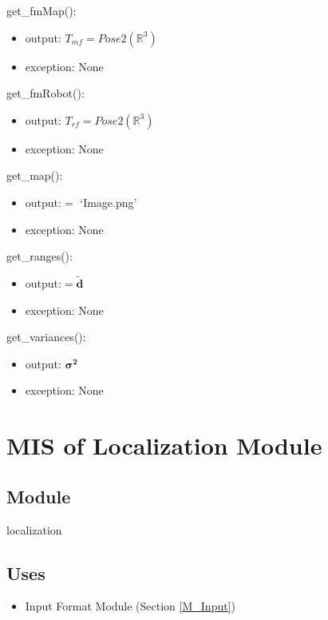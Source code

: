 \documentclass[12pt, titlepage]{article}
\begin{document}
\noindent get\_fmMap():
\begin{itemize}
    \item output: $T_{mf}=Pose2(\mathbb{R}^{3})$
    \item exception: None
\end{itemize}

\noindent get\_fmRobot():
\begin{itemize}
    \item output: $T_{rf}=Pose2(\mathbb{R}^{3})$
    \item exception: None
\end{itemize}

\noindent get\_map():
\begin{itemize}
    \item output:$=$ \lq Image.png\rq
    \item exception: None
\end{itemize}

\noindent get\_ranges():
\begin{itemize}
    \item output:$=\mathbf{\tilde{d}}$
    \item exception: None
\end{itemize}

\noindent get\_variances():
\begin{itemize}
    \item output: $\boldsymbol{\sigma^2}$
    \item exception: None
\end{itemize}


\newpage

\section{MIS of Localization Module} \label{M_Localize}

\subsection{Module}

localization

\subsection{Uses}
\begin{itemize}
  \item Input Format Module (Section \ref{M_Input})
  
\end{itemize}
\end{document}

